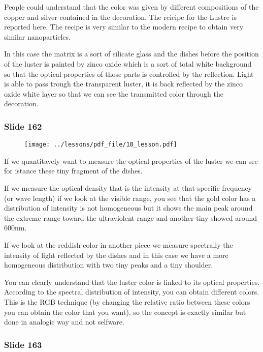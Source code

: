 \documentclass[../main/main.tex]{subfiles}
\begin{document}
People could understand that the color was given by different compositions of the copper and silver contained in the decoration. The reicipe for the Lustre is reported here.
The recipe is very similar to the modern recipe to obtain very similar nanoparticles.

In this case the matrix is a sort of silicate glass and the dishes before the position of the luster is painted by zinco oxide which is a sort of total white background so that the optical properties of those parts is controlled by the reflection. Light is able to pass trough the transparent luster, it is back reflected by the zinco oxide white layer so that we can see the transmitted color through the decoration.

\newpage

\subsubsection{Slide 162}

\begin{figure}[h!]
\centering
\texttt{[image: ../lessons/pdf\_file/10\_lesson.pdf]}
\end{figure}

If we quantitavely want to measure the optical properties of the luster we can see for istance these tiny fragment of the dishes.

If we measure the optical density that is the intensity at that specific frequency (or wave length) if we look at the visible range, you see that the  gold color has a distribution of intensity is not homogeneous but it shows the main peak around the extreme range toward the ultraviolent range and another tiny showed around 600nm.

If we look at the reddish color in another piece we measure spectrally the intensity of light reflected by the dishes and in this case we have a more homogeneous distribution with two tiny peaks and a tiny shoulder.

You can clearly understand that the luster color is linked to its optical properties. According to the spectral distribution of intensity, you can obtain different colors. This is the RGB technique (by changing the relative ratio between these colors you can obtain the color that you want), so the concept is exactly similar but done in analogic way and not selfware.

\newpage

\subsubsection{Slide 163}
\end{document}
